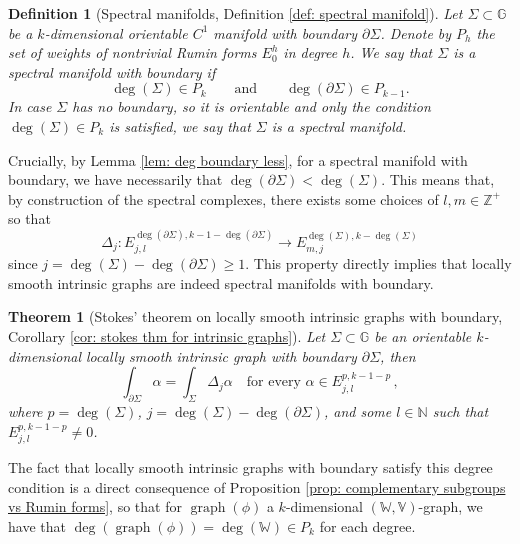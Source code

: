 \documentclass[dvipsnames]{amsart}
\newtheorem{theoremAlph}{Theorem}
\newtheorem{definAlph}{Definition}
\theoremstyle{definition}
\theoremstyle{definition}
\numberwithin{equation}{section}
\newcommand{\W}{\mathbb{W}}
\newcommand{\V}{\mathbb{V}}
\begin{document}
\begin{definAlph}
[Spectral manifolds, Definition \ref{def: spectral manifold}]\em 
Let $\Sigma\subset\mathbb G$ be a $k$-dimensional orientable $C^1$ manifold with boundary $\partial\Sigma$. Denote by $P_h$ the set of weights of nontrivial Rumin forms $E_0^h$ in degree $h$. We say that $\Sigma$ is a \emph{spectral manifold with boundary} if
\[
\deg(\Sigma)\in P_k
\qquad\text{and}\qquad
\deg(\partial\Sigma)\in P_{k-1}.
\]
In case $\Sigma$ has no boundary, so it is orientable and only the condition $\deg(\Sigma)\in P_k$ is satisfied, we say that $\Sigma$ is a {\em spectral manifold}.
\end{definAlph}

Crucially, by Lemma \ref{lem: deg boundary less}, for a spectral manifold with boundary, we have necessarily that  $\operatorname{deg}(\partial\Sigma)<\operatorname{deg}(\Sigma)$. This means that, by construction of the spectral complexes, there exists some choices of $l,m\in\mathbb Z^+$ so that $$\Delta_j\colon E_{j,l}^{\operatorname{deg}(\partial\Sigma),k-1-\operatorname{deg}(\partial\Sigma)}\longrightarrow E_{m,j}^{\operatorname{deg}(\Sigma),k-\operatorname{deg}(\Sigma)}$$
since $j=\operatorname{deg}(\Sigma)-\operatorname{deg}(\partial\Sigma)\ge 1$. This property directly implies that locally smooth intrinsic graphs are indeed spectral manifolds with boundary.

\begin{theoremAlph}
 [Stokes' theorem on locally smooth intrinsic graphs with boundary, Corollary \ref{cor: stokes thm for intrinsic graphs}]
Let $\Sigma\subset\mathbb{G}$ be an orientable $k$-dimensional locally smooth intrinsic graph with boundary $\partial\Sigma$, then
\[
\int_{\partial\Sigma}\alpha
=
\int_\Sigma \Delta_j \alpha
\quad
\text{for every } \alpha\in E_{j,l}^{p,k-1-p}\,,
\]
where $p=\operatorname{deg}(\Sigma)$, $j=\operatorname{deg}(\Sigma)-\operatorname{deg}(\partial
\Sigma)$, and some $l\in\mathbb{N}$ such that $E_{j,l}^{p,k-1-p}\neq 0$.
\end{theoremAlph}
The fact that locally smooth intrinsic graphs with boundary satisfy this degree condition is a direct consequence of Proposition \ref{prop: complementary subgroups vs Rumin forms}, so that for $\operatorname{graph}(\phi)$ a $k$-dimensional $(\W,\V)$-graph, we have that $\operatorname{deg}(\operatorname{graph}(\phi))=\operatorname{deg}(\W)\in P_k$ for each degree.
\end{document}
